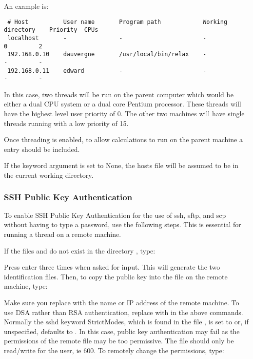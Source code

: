  An example is: 
  

 {\footnotesize \begin{verbatim} 
 # Host          User name       Program path            Working directory    Priority  CPUs 
 localhost       -               -                       -                    0         2 
 192.168.0.10    dauvergne       /usr/local/bin/relax    -                    -         - 
 192.168.0.11    edward          -                       -                    -         - 
 \end{verbatim}} 

 In this case, two threads will be run on the parent computer which would be either a dual CPU system or a dual core  Pentium processor.  These threads will have the highest level user priority of 0.  The other two machines will have single threads running with a low priority of 15. 
  

 Once threading is enabled, to allow calculations to run on the parent machine a  entry should be included. 
  

 If the keyword argument  is set to None, the hosts file will be assumed to be in the current working directory. 
  

  
 \subsubsection{SSH Public Key Authentication} 

 To enable SSH Public Key Authentication for the use of ssh, sftp, and scp without having to type a password, use the following steps.  This is essential for running a thread on a remote machine. 
  

 If the files  and  do not exist in the directory , type: 
  


 Press enter three times when asked for input.  This will generate the two identification files.  Then, to copy the public key into the  file on the remote machine, type: 
  


 Make sure you replace  with the name or IP address of the remote machine.  To use DSA rather than RSA authentication, replace  with  in the above commands. Normally the sshd keyword StrictModes, which is found in the file , is set to  or, if unspecified, defaults to .  In this case, public key authentication may fail as the permissions of the remote file  may be too permissive.  The file should only be read/write for the user, ie 600.  To remotely change the permissions, type: 
  

